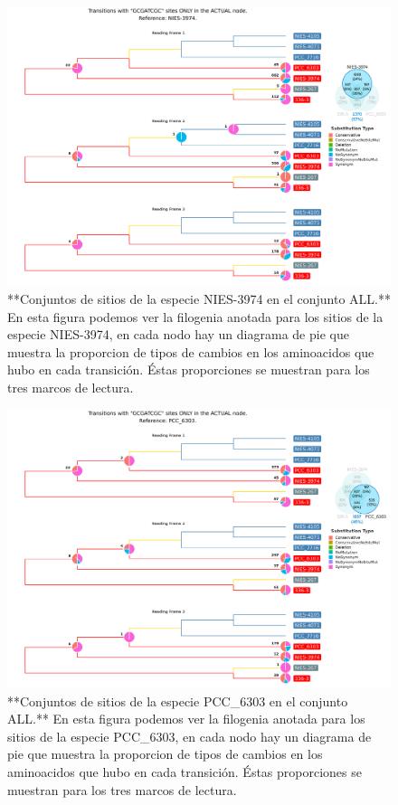 \documentclass[
]{book}
\begin{document}
\begin{figure}

{\centering \includegraphics[width=1.2\linewidth]{Clados/Calothrix_B/figures/A/GCGATCGC/Actual/NIES-3974_Actual_A_tree} 

}

\caption{**Conjuntos de sitios de la especie NIES-3974 en el conjunto ALL.** En esta figura podemos ver la filogenia anotada para los sitios de la especie NIES-3974, en cada nodo hay un diagrama de pie que muestra la proporcion de tipos de cambios en los aminoacidos que hubo en cada transición. Éstas proporciones se muestran para los tres marcos de lectura.}\label{fig:FIG14}
\end{figure}

\begin{figure}

{\centering \includegraphics[width=1.2\linewidth]{Clados/Calothrix_B/figures/A/GCGATCGC/Actual/PCC_6303_Actual_A_tree} 

}

\caption{**Conjuntos de sitios de la especie PCC\_6303 en el conjunto ALL.** En esta figura podemos ver la filogenia anotada para los sitios de la especie PCC\_6303, en cada nodo hay un diagrama de pie que muestra la proporcion de tipos de cambios en los aminoacidos que hubo en cada transición. Éstas proporciones se muestran para los tres marcos de lectura.}\label{fig:FIG15}
\end{figure}
\end{document}
